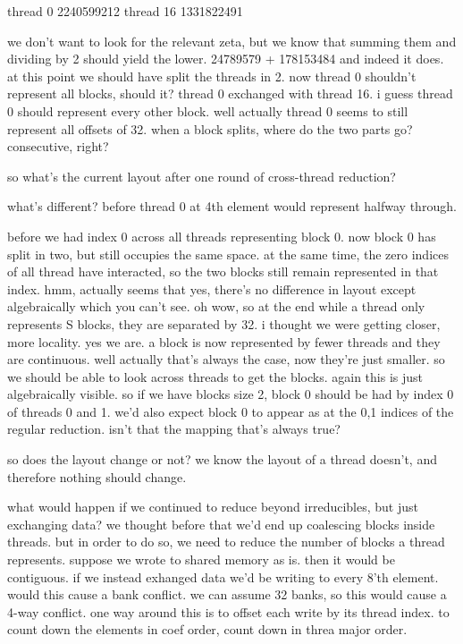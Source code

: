 thread 0
2240599212
thread 16
1331822491

we don't want to look for the relevant zeta, but we know that summing them and dividing by 2 should yield the lower.
24789579 + 178153484
and indeed it does.
at this point we should have split the threads in 2. 
now thread 0 shouldn't represent all blocks, should it?
thread 0 exchanged with thread 16.
i guess thread 0 should represent every other block.
well actually thread 0 seems to still represent all offsets of 32.
when a block splits, where do the two parts go? consecutive, right?

so what's the current layout after one round of cross-thread reduction?

what's different?
before thread 0 at 4th element would represent halfway through. 

before we had index 0 across all threads representing block 0.
now block 0 has split in two, but still occupies the same space. 
at the same time, the zero indices of all thread have interacted, so the two blocks still remain represented in that index. 
hmm, actually seems that yes, there's no difference in layout except algebraically which you can't see. 
oh wow, so at the end while a thread only represents S blocks, they are separated by 32. i thought we were getting closer, more locality. yes we are. a block is now represented by fewer threads and they are continuous. well actually that's always the case, now they're just smaller.
so we should be able to look across threads to get the blocks. again this is just algebraically visible.
so if we have blocks size 2, block 0 should be had by index 0 of threads 0 and 1. we'd also expect block 0 to appear as at the 0,1 indices of the regular reduction. isn't that the mapping that's always true? 

so does the layout change or not?
we know the layout of a thread doesn't, and therefore nothing should change.

what would happen if we continued to reduce beyond irreducibles, but just exchanging data?
we thought before that we'd end up coalescing blocks inside threads. 
but in order to do so, we need to reduce the number of blocks a thread represents. 
suppose we wrote to shared memory as is. then it would be contiguous. if we instead exhanged data we'd be writing to every 8'th element. would this cause a bank conflict. we can assume 32 banks, so this would cause a 4-way conflict. one way around this is to offset each write by its thread index.
to count down the elements in coef order, count down in threa major order. 

